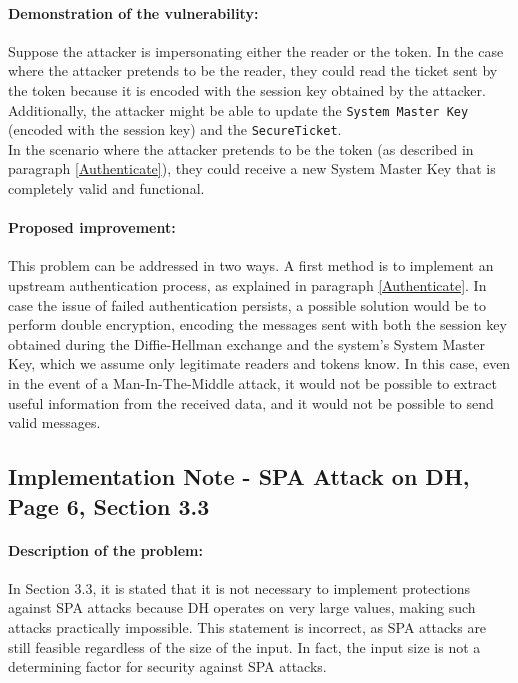 \documentclass[12pt]{article}
\begin{document}
    \paragraph{Demonstration of the vulnerability:}
    Suppose the attacker is impersonating either the reader or the token. In the case where the attacker pretends to be the reader, they could read the ticket sent by the token because it is encoded with the session key obtained by the attacker. Additionally, the attacker might be able to update the \texttt{System Master Key} (encoded with the session key) and the \texttt{SecureTicket}.
    \\
    In the scenario where the attacker pretends to be the token (as described in paragraph \ref*{Authenticate}), they could receive a new System Master Key that is completely valid and functional.
    
    \paragraph{Proposed improvement:}
    This problem can be addressed in two ways. A first method is to implement an upstream authentication process, as explained in paragraph \ref*{Authenticate}.
    In case the issue of failed authentication persists, a possible solution would be to perform double encryption, encoding the messages sent with both the session key obtained during the Diffie-Hellman exchange and the system's System Master Key, which we assume only legitimate readers and tokens know.
    In this case, even in the event of a Man-In-The-Middle attack, it would not be possible to extract useful information from the received data, and it would not be possible to send valid messages.

\subsection{Implementation Note - SPA Attack on DH, Page 6, Section 3.3}
    \paragraph{Description of the problem:}
    In Section 3.3, it is stated that it is not necessary to implement protections against SPA attacks because DH operates on very large values, making such attacks practically impossible. This statement is incorrect, as SPA attacks are still feasible regardless of the size of the input. In fact, the input size is not a determining factor for security against SPA attacks.
\end{document}
